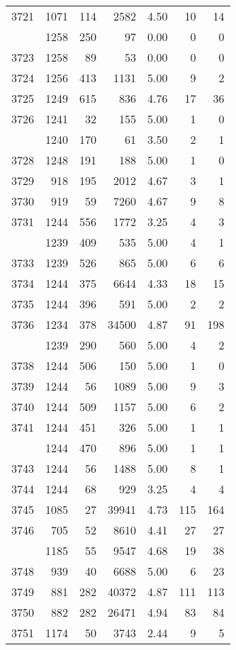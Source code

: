 \documentclass[
]{article}
\begin{document}
\begin{table}
\begin{tabular}[t]{lrrrrrr}
3721 & 1071 & 114 & 2582 & 4.50 & 10 & 14\\
\addlinespace
3722 & 1258 & 250 & 97 & 0.00 & 0 & 0\\
3723 & 1258 & 89 & 53 & 0.00 & 0 & 0\\
3724 & 1256 & 413 & 1131 & 5.00 & 9 & 2\\
3725 & 1249 & 615 & 836 & 4.76 & 17 & 36\\
3726 & 1241 & 32 & 155 & 5.00 & 1 & 0\\
\addlinespace
3727 & 1240 & 170 & 61 & 3.50 & 2 & 1\\
3728 & 1248 & 191 & 188 & 5.00 & 1 & 0\\
3729 & 918 & 195 & 2012 & 4.67 & 3 & 1\\
3730 & 919 & 59 & 7260 & 4.67 & 9 & 8\\
3731 & 1244 & 556 & 1772 & 3.25 & 4 & 3\\
\addlinespace
3732 & 1239 & 409 & 535 & 5.00 & 4 & 1\\
3733 & 1239 & 526 & 865 & 5.00 & 6 & 6\\
3734 & 1244 & 375 & 6644 & 4.33 & 18 & 15\\
3735 & 1244 & 396 & 591 & 5.00 & 2 & 2\\
3736 & 1234 & 378 & 34500 & 4.87 & 91 & 198\\
\addlinespace
3737 & 1239 & 290 & 560 & 5.00 & 4 & 2\\
3738 & 1244 & 506 & 150 & 5.00 & 1 & 0\\
3739 & 1244 & 56 & 1089 & 5.00 & 9 & 3\\
3740 & 1244 & 509 & 1157 & 5.00 & 6 & 2\\
3741 & 1244 & 451 & 326 & 5.00 & 1 & 1\\
\addlinespace
3742 & 1244 & 470 & 896 & 5.00 & 1 & 1\\
3743 & 1244 & 56 & 1488 & 5.00 & 8 & 1\\
3744 & 1244 & 68 & 929 & 3.25 & 4 & 4\\
3745 & 1085 & 27 & 39941 & 4.73 & 115 & 164\\
3746 & 705 & 52 & 8610 & 4.41 & 27 & 27\\
\addlinespace
3747 & 1185 & 55 & 9547 & 4.68 & 19 & 38\\
3748 & 939 & 40 & 6688 & 5.00 & 6 & 23\\
3749 & 881 & 282 & 40372 & 4.87 & 111 & 113\\
3750 & 882 & 282 & 26471 & 4.94 & 83 & 84\\
3751 & 1174 & 50 & 3743 & 2.44 & 9 & 5\\

\end{tabular}
\end{table}
\end{document}
